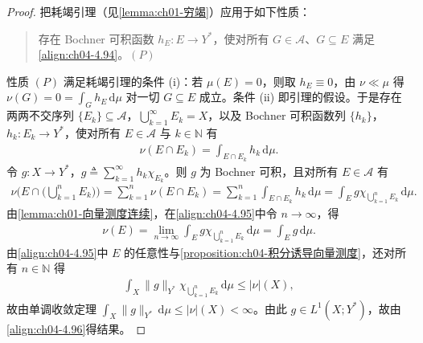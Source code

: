 \documentclass[../../main.tex]{subfiles}%
\begin{document}
\begin{proof}
把耗竭引理（见\cref{lemma:ch01-穷竭}）应用于如下性质：
\begin{quote}
存在 Bochner 可积函数 $h_E:E\to Y^*$，使对所有 $G\in\mathcal{A}$、$G\subseteq E$ 满足\eqref{align:ch04-4.94}。\hfill$(P)$
\end{quote}
性质 $(P)$ 满足耗竭引理的条件 (i)：若 $\mu(E)=0$，则取 $h_E\equiv0$，由 $\nu\ll\mu$ 得 $\nu(G)=0=\int_Gh_E\,\mathrm{d}\mu$ 对一切 $G\subseteq E$ 成立。条件 (ii) 即引理的假设。于是存在两两不交序列 $\{E_k\}\subseteq\mathcal{A}$，$\bigcup_{k=1}^\infty E_k=X$，以及 Bochner 可积函数列 $\{h_k\}$，$h_k:E_k\to Y^*$，使对所有 $E\in\mathcal{A}$ 与 $k\in\mathbb{N}$ 有
\begin{align*}
\nu(E\cap E_k)=\int_{E\cap E_k}h_k\,\mathrm{d}\mu.
\end{align*}
令 $g:X\to Y^*$，$g\triangleq\sum_{k=1}^\infty h_k\chi_{E_k}$。则 $g$ 为 Bochner 可积，且对所有 $E\in\mathcal{A}$ 有
\begin{align}
\nu\Big(E\cap\Big(\bigcup_{k=1}^nE_k\Big)\Big)=\sum_{k=1}^n\nu(E\cap E_k)=\sum_{k=1}^n\int_{E\cap E_k}h_k\,\mathrm{d}\mu=\int_E g\chi_{\bigcup_{k=1}^nE_k}\,\mathrm{d}\mu. \label{align:ch04-4.95}
\end{align}
由\cref{lemma:ch01-向量测度连续}，在\eqref{align:ch04-4.95}中令 $n\to\infty$，得
\begin{align}
\nu(E)=\lim_{n\to\infty}\int_E g\chi_{\bigcup_{k=1}^nE_k}\,\mathrm{d}\mu=\int_E g\,\mathrm{d}\mu. \label{align:ch04-4.96}
\end{align}
由\eqref{align:ch04-4.95}中 $E$ 的任意性与\cref{proposition:ch04-积分诱导向量测度}，还对所有 $n\in\mathbb{N}$ 得
\begin{align*}
\int_X\|g\|_{Y^*}\chi_{\bigcup_{k=1}^nE_k}\,\mathrm{d}\mu\leqslant|\nu|(X),
\end{align*}
故由单调收敛定理 $\int_X\|g\|_{Y^*}\,\mathrm{d}\mu\leqslant|\nu|(X)<\infty$。由此 $g\in L^1(X;Y^*)$，故由\eqref{align:ch04-4.96}得结果。
\end{proof}
\end{document}
